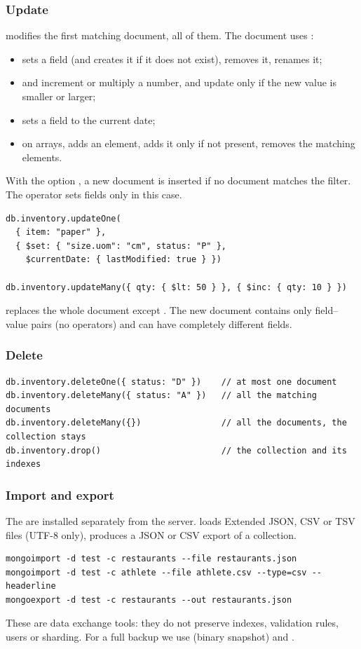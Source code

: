 \subsubsection{Update}
 modifies the first matching document,  all of them. The  document uses :
\begin{itemize}
  \item {} sets a field (and creates it if it does not exist),  removes it,  renames it;
  \item {} and  increment or multiply a number,  and  update only if the new value is smaller or larger;
  \item {} sets a field to the current date;
  \item on arrays,  adds an element,  adds it only if not present,  removes the matching elements.
\end{itemize}
With the option , a new document is inserted if no document matches the filter. The operator  sets fields only in this case.
\begin{lstlisting}
db.inventory.updateOne(
  { item: "paper" },
  { $set: { "size.uom": "cm", status: "P" },
    $currentDate: { lastModified: true } })

db.inventory.updateMany({ qty: { $lt: 50 } }, { $inc: { qty: 10 } })
\end{lstlisting}
 replaces the whole document except . The new document contains only field--value pairs (no operators) and can have completely different fields.

\subsubsection{Delete}
\begin{lstlisting}
db.inventory.deleteOne({ status: "D" })    // at most one document
db.inventory.deleteMany({ status: "A" })   // all the matching documents
db.inventory.deleteMany({})                // all the documents, the collection stays
db.inventory.drop()                        // the collection and its indexes
\end{lstlisting}

\subsubsection{Import and export}
The  are installed separately from the server.  loads Extended JSON, CSV or TSV files (UTF-8 only),  produces a JSON or CSV export of a collection.
\begin{lstlisting}
mongoimport -d test -c restaurants --file restaurants.json
mongoimport -d test -c athlete --file athlete.csv --type=csv --headerline
mongoexport -d test -c restaurants --out restaurants.json
\end{lstlisting}
These are data exchange tools: they do not preserve indexes, validation rules, users or sharding. For a full backup we use  (binary snapshot) and .

